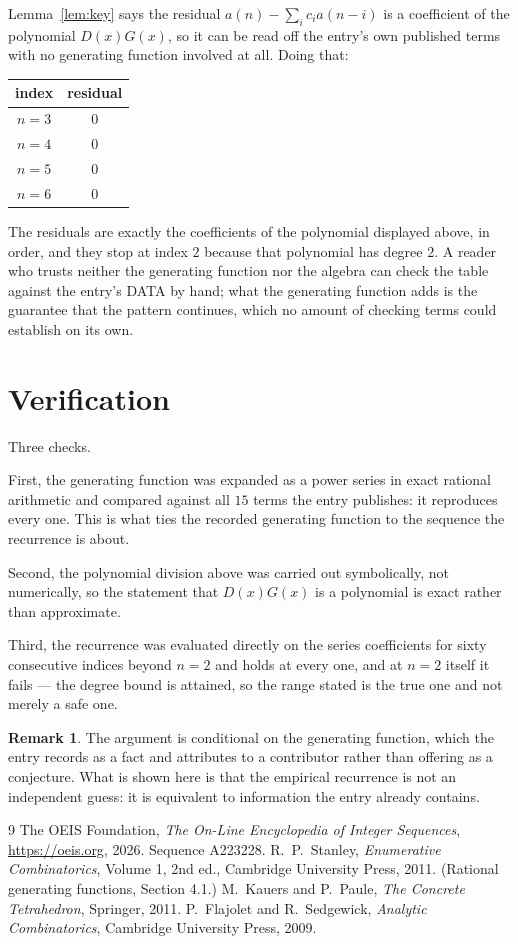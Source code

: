 \documentclass[11pt,a4paper]{article}
\theoremstyle{plain}
\theoremstyle{definition}
\newtheorem{remark}[theorem]{Remark}
\begin{document}
Lemma~\ref{lem:key} says the residual $a(n)-\sum_ic_ia(n-i)$ is a coefficient of the
polynomial $D(x)G(x)$, so it can be read off the entry's own published terms with no
generating function involved at all. Doing that:
\begin{center}
\begin{tabular}{cc}
index & residual \\ \hline
$n=3$ & $0$ \\
$n=4$ & $0$ \\
$n=5$ & $0$ \\
$n=6$ & $0$
\end{tabular}
\end{center}
The residuals are exactly the coefficients of the polynomial displayed above, in order, and
they stop at index $2$ because that polynomial has degree $2$. A reader who trusts
neither the generating function nor the algebra can check the table against the entry's DATA
by hand; what the generating function adds is the guarantee that the pattern continues, which
no amount of checking terms could establish on its own.

\section{Verification}

Three checks.

First, the generating function was expanded as a power series in exact rational arithmetic and
compared against all $15$ terms the entry publishes: it reproduces every one. This is
what ties the recorded generating function to the sequence the recurrence is about.

Second, the polynomial division above was carried out symbolically, not numerically, so the
statement that $D(x)G(x)$ is a polynomial is exact rather than approximate.

Third, the recurrence was evaluated directly on the series coefficients for sixty consecutive
indices beyond $n=2$ and holds at every one, and at $n=2$ itself it fails --- the
degree bound is attained, so the range stated is the true one and not merely a safe one.

\begin{remark}
The argument is conditional on the generating function, which the entry records as a fact and
attributes to a contributor rather than offering as a conjecture. What is shown here is that
the empirical recurrence is not an independent guess: it is equivalent to information the
entry already contains.
\end{remark}

\begin{thebibliography}{9}
 The OEIS Foundation, \emph{The On-Line Encyclopedia of Integer
Sequences}, \url{https://oeis.org}, 2026. Sequence A223228.
 R.~P.~Stanley, \emph{Enumerative Combinatorics}, Volume 1, 2nd ed.,
Cambridge University Press, 2011. (Rational generating functions, Section 4.1.)
 M.~Kauers and P.~Paule, \emph{The Concrete Tetrahedron}, Springer, 2011.
 P.~Flajolet and R.~Sedgewick, \emph{Analytic Combinatorics}, Cambridge
University Press, 2009.
\end{thebibliography}
\end{document}
